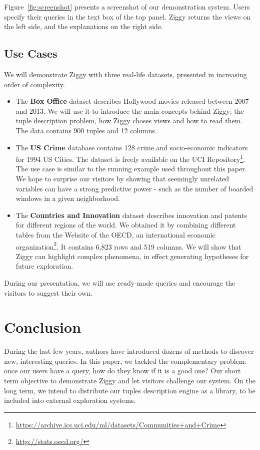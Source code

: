 Figure~\ref{fig:screenshot} presents a screenshot of our demonstration system.
Users specify their queries in the text box of the top panel. Ziggy returns the
views on the left side, and the explanations on the right side.

\subsection{Use Cases}
\label{sec:usecases}

We will demonstrate Ziggy with three real-life datasets, presented in
increasing order of complexity.
\begin{itemize}
    \item The \textbf{Box Office} dataset describes Hollywood movies released
        between 2007 and 2013. We will use it to introduce the main concepts behind
        Ziggy: the tuple description problem, how Ziggy choses views and how to
        read them. The data contains 900 tuples and 12 columns.
    \item The \textbf{US Crime} database contains 128 crime and socio-economic
        indicators for 1994 US Cities. The dataset is freely available on the
        UCI Repository\footnote{\url{https://archive.ics.uci.edu/ml/datasets/Communities+and+Crime}}.
        The use case is similar to the running example used throughout this
        paper. We hope to surprise our visitors by showing that seemingly
        unrelated variables can have a strong predictive power - such as the
        number of boarded windows in a given neighborhood.
    \item The \textbf{Countries and Innovation} dataset describes innovation
        and patents for different regions of the world. We obtained it by
        combining different tables from the Website of the OECD, an international
        economic organization\footnote{\url{http://stats.oecd.org/}}. It
        contains 6,823 rows and 519 columns. We will show that Ziggy can
        highlight complex phenomena, in effect generating hypotheses for future
        exploration.
\end{itemize}
During our presentation, we will use ready-made queries and encourage the
visitors to suggest their own.

\section{Conclusion}
\label{sec:conclusion}
During the last few years, authors have introduced dozens of methods to
discover new, interesting queries. In this paper, we tackled the complementary
problem: once our users have a query, how do they know if it is a good one?
Our short term objective to demonstrate Ziggy and let visitors challenge our
system. On the long term, we intend to distribute our tuples description engine
as a library, to be included into external exploration systems.
